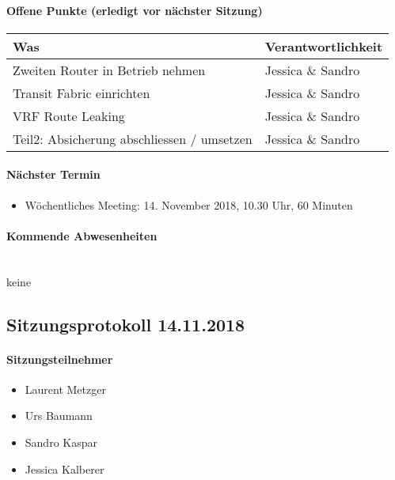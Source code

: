 \paragraph{Offene Punkte (erledigt vor nächster Sitzung)} \mbox{}
\begin{table}[H]
	\centering
	\begin{tabularx}{\textwidth}{X | p{4.5cm}}
		\rowcolor{gray!50}
		\textbf{Was} & \textbf{Verantwortlichkeit} \\
		\hline	
		Zweiten Router in Betrieb nehmen & Jessica \& Sandro \\
		Transit Fabric einrichten & Jessica \& Sandro  \\
		VRF Route Leaking & Jessica \& Sandro \\
		Teil2: Absicherung abschliessen / umsetzen & Jessica \& Sandro \\
	\end{tabularx}
	\label{tab:my-label}
\end{table}

\paragraph{Nächster Termin}
\begin{itemize}	
	\item Wöchentliches Meeting: 14. November 2018, 10.30 Uhr, 60 Minuten
\end{itemize}

\paragraph{Kommende Abwesenheiten} \mbox{}\\
keine








\subsection{Sitzungsprotokoll 14.11.2018}

\paragraph{Sitzungsteilnehmer}
\begin{itemize}	
	\item Laurent Metzger
	\item Urs Baumann
	\item Sandro Kaspar
	\item Jessica Kalberer
\end{itemize}

